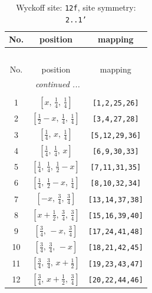 \documentclass[fleqn,8pt]{jsarticle}
\begin{document}
\begin{longtable}{ccc}
\caption{Wyckoff site: {\tt 12f}, site symmetry: {\tt 2..1'}}
 \\
 \hline \hline
No. & position & mapping \\ \hline \endfirsthead

\multicolumn{2}{l}{\tablename\ \thetable{}} \\
 \hline \hline
No. & position & mapping \\ \hline \endhead

 \hline \hline
\multicolumn{2}{r}{\footnotesize\it continued ...} \\ \endfoot

 \hline \hline
\multicolumn{2}{r}{} \\ \endlastfoot

1 & $\left[ x,\, \frac{1}{4},\, \frac{1}{4} \right]$ & {\tt [1,2,25,26]} \\ \hline
2 & $\left[ \frac{1}{2} - x,\, \frac{1}{4},\, \frac{1}{4} \right]$ & {\tt [3,4,27,28]} \\ \hline
3 & $\left[ \frac{1}{4},\, x,\, \frac{1}{4} \right]$ & {\tt [5,12,29,36]} \\ \hline
4 & $\left[ \frac{1}{4},\, \frac{1}{4},\, x \right]$ & {\tt [6,9,30,33]} \\ \hline
5 & $\left[ \frac{1}{4},\, \frac{1}{4},\, \frac{1}{2} - x \right]$ & {\tt [7,11,31,35]} \\ \hline
6 & $\left[ \frac{1}{4},\, \frac{1}{2} - x,\, \frac{1}{4} \right]$ & {\tt [8,10,32,34]} \\ \hline
7 & $\left[ - x,\, \frac{3}{4},\, \frac{3}{4} \right]$ & {\tt [13,14,37,38]} \\ \hline
8 & $\left[ x + \frac{1}{2},\, \frac{3}{4},\, \frac{3}{4} \right]$ & {\tt [15,16,39,40]} \\ \hline
9 & $\left[ \frac{3}{4},\, - x,\, \frac{3}{4} \right]$ & {\tt [17,24,41,48]} \\ \hline
10 & $\left[ \frac{3}{4},\, \frac{3}{4},\, - x \right]$ & {\tt [18,21,42,45]} \\ \hline
11 & $\left[ \frac{3}{4},\, \frac{3}{4},\, x + \frac{1}{2} \right]$ & {\tt [19,23,43,47]} \\ \hline
12 & $\left[ \frac{3}{4},\, x + \frac{1}{2},\, \frac{3}{4} \right]$ & {\tt [20,22,44,46]} \\
\end{longtable}
\renewcommand{\arraystretch}{1.2}
\end{document}
